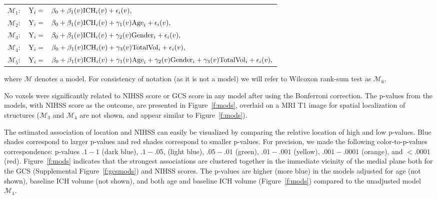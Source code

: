 \documentclass[10pt]{article}\usepackage[]{graphicx}\usepackage[]{color}
\begin{document}
\vspace{0.1in}
\begin{tabular}{rll}
\noindent $\mathcal{M}_1:$ & $ {\rm Y}_i =$ & \hspace{-0.18in} $\beta_0+\beta_1(v) {\rm ICH}_i(v) + \epsilon_{i}(v), $\\
$\mathcal{M}_2:$ & $ {\rm Y}_i = $ & \hspace{-0.18in} $ \beta_0+\beta_1(v) {\rm ICH}_i(v) + \gamma_1(v){\rm Age}_i + \epsilon_{i}(v), $\\
$\mathcal{M}_3:$ & $ {\rm Y}_i = $ & \hspace{-0.18in} $ \beta_0+\beta_1(v) {\rm ICH}_i(v) + \gamma_2(v){\rm Gender}_i + \epsilon_{i}(v), $\\
$\mathcal{M}_4:$ &$  {\rm Y}_i = $ & \hspace{-0.18in} $ \beta_0+\beta_1(v) {\rm ICH}_i(v) + \gamma_3(v){\rm TotalVol}_i + \epsilon_{i}(v),$ \\
$\mathcal{M}_5:$ &$  {\rm Y}_i = $ & \hspace{-0.18in} $ \beta_0+\beta_1(v) {\rm ICH}_i(v) + \gamma_1(v){\rm Age}_i  +\gamma_2(v){\rm Gender}_i +\gamma_3(v){\rm TotalVol}_i + \epsilon_{i}(v),$ \\
\end{tabular}
\vspace{0.1in}
\newline
where $\mathcal{M}$ denotes a model.  For consistency of notation (as it is not a model) we will refer to Wilcoxon rank-sum test as $\mathcal{M}_6$.


No voxels were significantly related to NIHSS score or GCS score in any model after using the Bonferroni correction.  The p-values from the models, with NIHSS score as the outcome, are presented in Figure~\ref{f:mods}, overlaid on a MRI T1 image for spatial localization of structures ($\mathcal{M}_3$ and $\mathcal{M}_4$ are not shown, and appear similar to Figure~\ref{f:mods}\protect{}).  

The estimated association of location and NIHSS can easily be visualized by comparing the relative location of high and low p-values. Blue shades correspond to larger p-values and red shades correspond to smaller p-values.  For precision, we made the following color-to-p-values correspondence: p-values $.1-1$ (dark blue), $.1-.05$, (light blue), $.05-.01$ (green), $.01-.001$ (yellow),  $.001-.0001$ (orange), and $< .0001$ (red).  Figure~\ref{f:mods} indicates that the strongest associations are clustered together in the immediate vicinity of the medial plane both for the GCS (Supplemental Figure~\ref{f:gcsmods}) and NIHSS scores.  The p-values are higher (more blue) in the models adjusted for age (not shown), baseline ICH volume (not shown), and both age and baseline ICH volume (Figure~\ref{f:mods}\protect{}) compared to the unadjusted model $\mathcal{M}_1$.  
\end{document}
